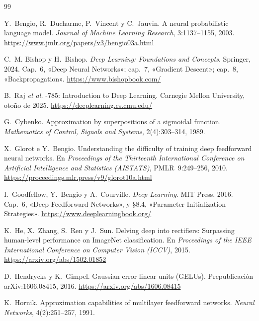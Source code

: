 \begin{thebibliography}{99}
\small

Y.~Bengio, R.~Ducharme, P.~Vincent y C.~Jauvin.
\newblock A neural probabilistic language model.
\newblock \emph{Journal of Machine Learning Research}, 3:1137--1155, 2003.
\newblock \url{https://www.jmlr.org/papers/v3/bengio03a.html}

C.~M. Bishop y H.~Bishop.
\newblock \emph{Deep Learning: Foundations and Concepts}.
\newblock Springer, 2024.
\newblock Cap.~6, «Deep Neural Networks»; cap.~7, «Gradient Descent»; cap.~8, «Backpropagation».
\newblock \url{https://www.bishopbook.com/}

B.~Raj \emph{et al.}
-785: Introduction to Deep Learning.
\newblock Carnegie Mellon University, otoño de 2025.
\newblock \url{https://deeplearning.cs.cmu.edu/}

G.~Cybenko.
\newblock Approximation by superpositions of a sigmoidal function.
\newblock \emph{Mathematics of Control, Signals and Systems}, 2(4):303--314, 1989.

X.~Glorot e Y.~Bengio.
\newblock Understanding the difficulty of training deep feedforward neural networks.
\newblock En \emph{Proceedings of the Thirteenth International Conference on Artificial Intelligence and Statistics (AISTATS)}, PMLR~9:249--256, 2010.
\newblock \url{https://proceedings.mlr.press/v9/glorot10a.html}

I.~Goodfellow, Y.~Bengio y A.~Courville.
\newblock \emph{Deep Learning}.
\newblock MIT Press, 2016.
\newblock Cap.~6, «Deep Feedforward Networks», y §8.4, «Parameter Initialization Strategies».
\newblock \url{https://www.deeplearningbook.org/}

K.~He, X.~Zhang, S.~Ren y J.~Sun.
\newblock Delving deep into rectifiers: Surpassing human-level performance on ImageNet classification.
\newblock En \emph{Proceedings of the IEEE International Conference on Computer Vision (ICCV)}, 2015.
\newblock \url{https://arxiv.org/abs/1502.01852}

D.~Hendrycks y K.~Gimpel.
\newblock Gaussian error linear units (GELUs).
\newblock Prepublicación arXiv:1606.08415, 2016.
\newblock \url{https://arxiv.org/abs/1606.08415}

K.~Hornik.
\newblock Approximation capabilities of multilayer feedforward networks.
\newblock \emph{Neural Networks}, 4(2):251--257, 1991.


\end{thebibliography}
